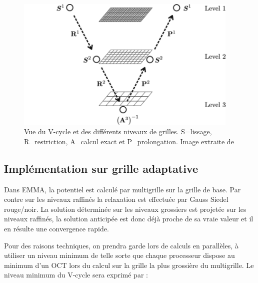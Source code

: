 \begin{figure}
	\begin{center}
	\includegraphics[width=0.95\textwidth]{img/02/Vcycle2.png}
	\caption[Multigrille]{Vue du V-cycle et des différents niveaux de grilles.
	 S=lissage, R=restriction, A=calcul exact et P=prolongation.
	 Image extraite de \cite{multigrid}
	 \label{fig:mgrid}}
	\end{center}
\end{figure}	


\subsection{Implémentation sur grille adaptative}

Dans EMMA, la potentiel est calculé par multigrille sur la grille de base. %
Par contre sur les niveaux raffinés la relaxation est effectuée par Gauss Siedel rouge/noir. %
La solution déterminée sur les niveaux grossiers est projetée sur les niveaux raffinés, la solution anticipée est donc déjà proche de sa vraie valeur et il en résulte une convergence rapide.

Pour des raisons techniques, on prendra garde lors de calculs en parallèles, à utiliser un niveau minimum de telle sorte que chaque processeur dispose au minimum d'un OCT lors du calcul sur la grille la plus grossière du multigrille.
Le niveau minimum du V-cycle sera exprimé par : 

